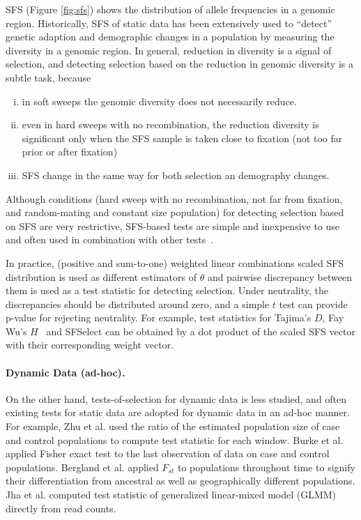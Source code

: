 \documentclass[11pt]{article}
\begin{document}
SFS (Figure \ref{fig:sfs}) shows the distribution of allele 
frequencies in a genomic region.
Historically, SFS of static data has been extensively used to 
``detect'' genetic 
adaption and demographic changes in a population by measuring the diversity in a genomic region. 
In general, reduction in diversity is a signal of 
selection, and detecting selection based on the reduction in 
genomic diversity is a subtle task, because 
\begin{enumerate}[(i)]
	\item  in soft sweeps the genomic diversity does not 
	necessarily reduce.
	\item even in hard sweeps with no recombination, the 
	reduction diversity is 
	significant only when the SFS sample is taken close to 
	fixation (not too 
	far prior or after fixation)
	\item SFS change in the same way for both selection an 
	demography changes. 
\end{enumerate}

Although conditions (hard sweep with no recombination, not 
far from 
fixation, and random-mating and constant size population) 
for detecting 
selection based on SFS are very restrictive, SFS-based tests 
are simple and 
inexpensive to use and often used in combination with 
other tests~\cite{akey2009constructing,vitti2013detecting}. 

In practice, (positive and sum-to-one) weighted 
linear combinations scaled SFS distribution \cite{achaz2009frequency}
is used as different estimators of $\theta$ and pairwise discrepancy between 
them is used as a test statistic for detecting selection.
Under neutrality, the discrepancies should be distributed around zero, and a 
simple $t$ test can provide p-value for rejecting neutrality. 
For example, 
test statistics for Tajima's $D$\cite{tajima1989statistical}, 
Fay Wu's $H$~\cite{fay2000hitchhiking} and 
SFSelect\cite{ronen2013learning} can be obtained by a dot 
product of the scaled SFS vector with their corresponding weight vector. 




\paragraph{Dynamic Data (ad-hoc).} On the other hand, tests-of-selection for 
dynamic 
data is less studied, and 
often existing tests for static data are adopted for dynamic data in an ad-hoc 
manner. For example, Zhu et al. \cite{zhou2011experimental} used the ratio of 
the estimated 
population size of case and control populations to compute test statistic for 
each window.
Burke et al.~\cite{burke2010genome} applied 
 Fisher exact test to the last observation of data on case and control 
 populations.
 Bergland et al. \cite{bergland2014genomic} 
 applied $F_{st}$ to populations throughout time to signify their 
 differentiation from ancestral as well as geographically different 
 populations. 
 Jha et al. \cite{jha2015whole} 
 computed test statistic of generalized 
 linear-mixed model (GLMM) directly from read counts. 
\end{document}
